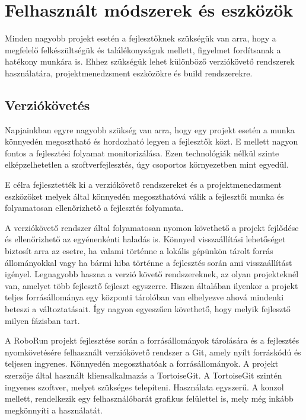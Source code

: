 \chapter{Felhasznált módszerek és eszközök}\label{ch:MODSZEREK_ES_ESZKOZOK}

\begin{osszefoglal}
	Minden nagyobb projekt esetén a fejlesztőknek szükségük van arra, hogy a megfelelő felkészültségük és találékonyságuk mellett, figyelmet fordítsanak a hatékony munkára is. Ehhez szükségük lehet különböző verziókövető rendszerek használatára, projektmenedzsment eszközökre és build rendszerekre.
\end{osszefoglal}


\section{Verziókövetés}

Napjainkban egyre nagyobb szükség van arra, hogy egy projekt esetén a munka könnyedén megosztható és hordozható legyen a fejlesztők közt. E mellett nagyon fontos a fejlesztési folyamat monitorizálása. Ezen technológiák nélkül szinte elképzelhetetlen a szoftverfejlesztés, úgy csoportos környezetben mint egyedül.

	E célra fejlesztették  ki a verziókövető rendszereket és a projektmenedzsment eszközöket melyek által könnyedén megoszthatóvá válik a fejlesztői munka és folyamatosan ellenőrizhető a fejlesztés folyamata.  
	
	A verziókövető rendszer által  folyamatosan nyomon követhető a projekt fejlődése és ellenőrizhető az egyénenkénti haladás is. Könnyed visszaállítási lehetőséget biztosít arra az esetre, ha valami történne a lokális gépünkön tárolt forrás állományokkal vagy ha bármi hiba történne a fejlesztés során ami visszaállítást igényel. Legnagyobb haszna a verzió követő rendszereknek, az olyan projekteknél van, amelyet több fejlesztő fejleszt egyszerre. Hiszen általában ilyenkor a projekt teljes forrásállománya egy központi tárolóban van elhelyezve ahová mindenki beteszi a változtatásait. Így nagyon egyeszűen követhető, hogy melyik fejlesztő milyen fázisban tart. 
	
	A RoboRun projekt fejlesztése során a forrásállományok tárolására és a fejlesztés nyomkövetésére felhasznált verziókövető rendszer a Git\citep{git}, amely nyílt forráskódú és teljesen ingyenes. Könnyedén megoszthatóak a forrásállományok. A projekt szerzője által használt kliensalkalmazás a  TortoiseGit\citep{tortoisegit}. A TortoiseGit szintén ingyenes szoftver, melyet szükséges telepíteni. Használata egyszerű. A konzol mellett, rendelkezik egy felhasználóbarát grafikus felülettel is, mely még inkább megkönnyíti a használatát.


